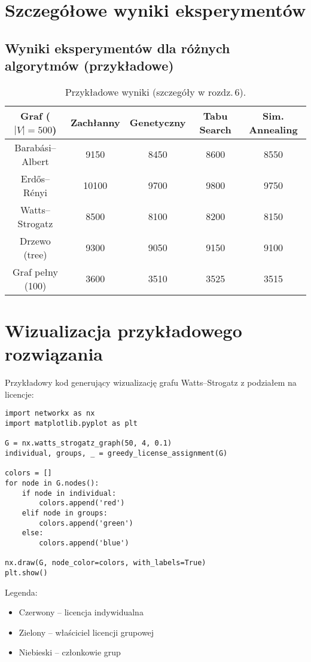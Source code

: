 \section{Szczegółowe wyniki eksperymentów}

\subsection{Wyniki eksperymentów dla różnych algorytmów (przykładowe)}

\begin{table}[h]
\centering
\begin{tabular}{|c|c|c|c|c|}
\hline
\textbf{Graf (\(|V|=500\))} & \textbf{Zachłanny} & \textbf{Genetyczny} & \textbf{Tabu Search} & \textbf{Sim. Annealing} \\
\hline
Barabási–Albert & 9150 & 8450 & 8600 & 8550 \\
Erdős–Rényi & 10100 & 9700 & 9800 & 9750 \\
Watts–Strogatz & 8500 & 8100 & 8200 & 8150 \\
Drzewo (tree) & 9300 & 9050 & 9150 & 9100 \\
Graf pełny (100) & 3600 & 3510 & 3525 & 3515 \\
\hline
\end{tabular}
\caption{Przykładowe wyniki (szczegóły w rozdz.\,6).}
\end{table}

\section{Wizualizacja przykładowego rozwiązania}

Przykładowy kod generujący wizualizację grafu Watts–Strogatz z podziałem na licencje:

\begin{verbatim}
import networkx as nx
import matplotlib.pyplot as plt

G = nx.watts_strogatz_graph(50, 4, 0.1)
individual, groups, _ = greedy_license_assignment(G)

colors = []
for node in G.nodes():
    if node in individual:
        colors.append('red')
    elif node in groups:
        colors.append('green')
    else:
        colors.append('blue')

nx.draw(G, node_color=colors, with_labels=True)
plt.show()
\end{verbatim}

Legenda:
\begin{itemize}
    \item Czerwony – licencja indywidualna
    \item Zielony – właściciel licencji grupowej
    \item Niebieski – członkowie grup
\end{itemize}

